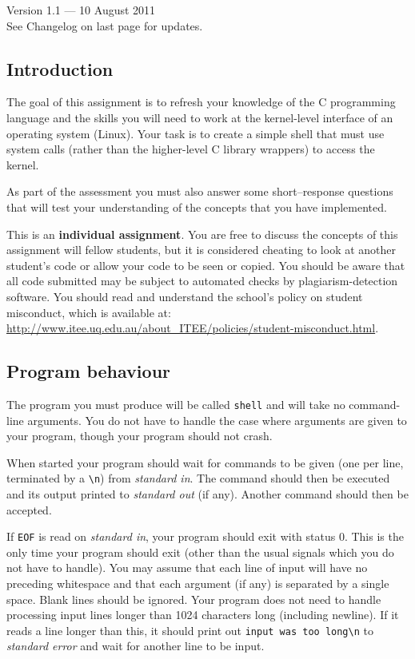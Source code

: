 \documentclass[12pt,a4paper]{article}
\begin{document}


\begin{center}
\color{red}
Version 1.1 --- 10 August 2011 \\
See Changelog on last page for updates.
\end{center}

\subsection*{Introduction}

The goal of this assignment is to refresh your knowledge of the C programming
language and the skills you will need to work at the kernel-level interface of
an operating system (Linux). Your task is to create a simple shell that must
use system calls (rather than the higher-level C library wrappers) to access
the kernel.

As part of the assessment you must also answer some short--response questions
that will test your understanding of the concepts that you have implemented.

This is an \textbf{individual assignment}. You are free to discuss the concepts 
of this assignment will fellow students, but it is considered cheating to look
at another student's code or allow your code to be seen or copied. You should
be aware that all code submitted may be subject to automated checks by
plagiarism-detection software. You should read and understand the school's policy
on student misconduct, which is available at: \url{http://www.itee.uq.edu.au/about_ITEE/policies/student-misconduct.html}.

\subsection*{Program behaviour}

The program you must produce will be called \texttt{shell} and will take no
command-line arguments. You do not have to handle the case where arguments are
given to your program, though your program should not crash.

When started your program should wait for commands to be given (one per line,
terminated by a \verb|\n|) from \textit{standard in}. The command should then
be executed and its output printed to \textit{standard out} (if any).  Another
command should then be accepted.

If \texttt{EOF} is read on \textit{standard in}, your program should exit with
status 0. This is the only time your program should exit (other than the usual
signals which you do not have to handle). You may assume that each line of input
will have no preceding whitespace and that each argument (if any) is separated
by a single space.  Blank lines should be ignored. Your program does not need
to handle processing input lines longer than 1024 characters long (including
newline). If it reads a line longer than this, it should print out 
\verb|input was too long\n| to \textit{standard error} and wait for another
line to be input. 
\end{document}
